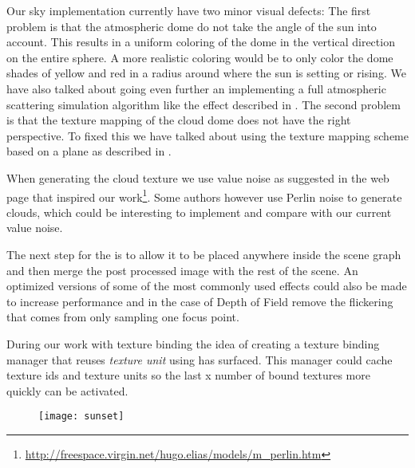 Our sky implementation currently have two minor visual defects: The
first problem is that the atmospheric dome do not take the angle of
the sun into account. This results in a uniform coloring of the dome
in the vertical direction on the entire sphere. A more realistic
coloring would be to only color the dome shades of yellow and red in a
radius around where the sun is setting or rising.
%
We have also talked about going even further an implementing a full
atmospheric scattering simulation algorithm like the
effect described in .
%
The second problem is that the texture mapping of the cloud dome does
not have the right perspective.
To fixed this we have talked about using the texture mapping scheme
based on a plane as described in .

When generating the cloud texture we use value noise as suggested in
the web page that inspired our
work\footnote{\url{http://freespace.virgin.net/hugo.elias/models/m_perlin.htm}}.
Some authors however use Perlin noise to generate clouds, which could
be interesting to implement and compare with our current value noise.

The next step for the  is to allow it to be
placed anywhere inside the scene graph and then merge the post
processed image with the rest of the scene. An optimized versions of
some of the most commonly used effects could also be made to increase
performance and in the case of Depth of Field remove the flickering
that comes from only sampling one focus point.

During our work with texture binding the idea of creating a texture
binding manager that reuses \emph{texture unit} using
 has
surfaced. This manager could cache texture ids and texture units so
the last x number of bound textures more quickly can be activated.

\begin{figure}
  \centering
  \texttt{[image: sunset]}
\end{figure}
